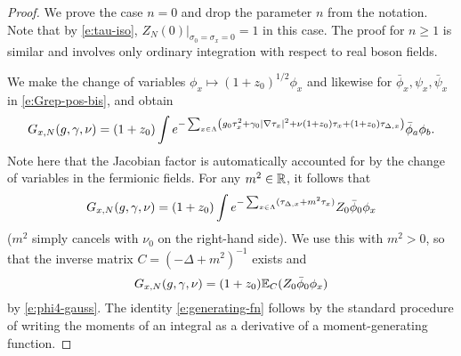 \begin{proof}
We prove the case $n = 0$ and drop the parameter $n$ from the notation. Note that by
\eqref{e:tau-iso},
$Z_N(0)\big|_{\sigma_0=\sigma_x=0} = 1$ in this case. The proof for $n \ge 1$ is similar
and involves only ordinary integration with respect to real boson fields.

We make the change of variables $\phi_x \mapsto (1 + z_0)^{1/2} \phi_x$
and likewise for $\bar\phi_x, \psi_x, \bar\psi_x$ in \eqref{e:Grep-pos-bis}, and obtain
\begin{equation}
\label{e:Grep-pos}
G_{x,N}(g,\gamma,\nu)
	=
(1+z_0) \int e^{-\sum_{x\in\Lambda}
\left(
	g_0 \tau_x^2 + \gamma_0 |\nabla \tau_x|^2 + \nu (1+z_0) \tau_x + (1+z_0)\tau_{\Delta,x}
\right)}
\bar\phi_a \phi_b.
\end{equation}
Note here that the Jacobian factor is automatically accounted for by the change of variables
in the fermionic fields.
For any $m^2 \in{\mathbb R}$, it follows that
\begin{equation}
\lbeq{GNint}
G_{x,N}(\gcc,\gamma,\nu)
    =
(1 + z_0) \int
e^{-\sum_{x\in\Lambda} (\tau_{\Delta,x} + m^2 \tau_x)}
Z_0 \phib_0 \phi_x
\end{equation}
($m^2$ simply cancels with $\nu_0$ on the right-hand side).
We use this with $m^2>0$, so that the inverse matrix $C=(-\Delta+m^2)^{-1}$ exists and
\begin{equation}
\label{e:G-gauss}
G_{x,N}(g, \gamma, \nu)
	=
(1 + z_0) \mathbb{E}_C (Z_0 \bar\phi_0 \phi_x)
\end{equation}
by \eqref{e:phi4-gauss}.
The identity \eqref{e:generating-fn} follows by the standard procedure of writing
the moments of an integral as a derivative of a moment-generating function.


\end{proof}
